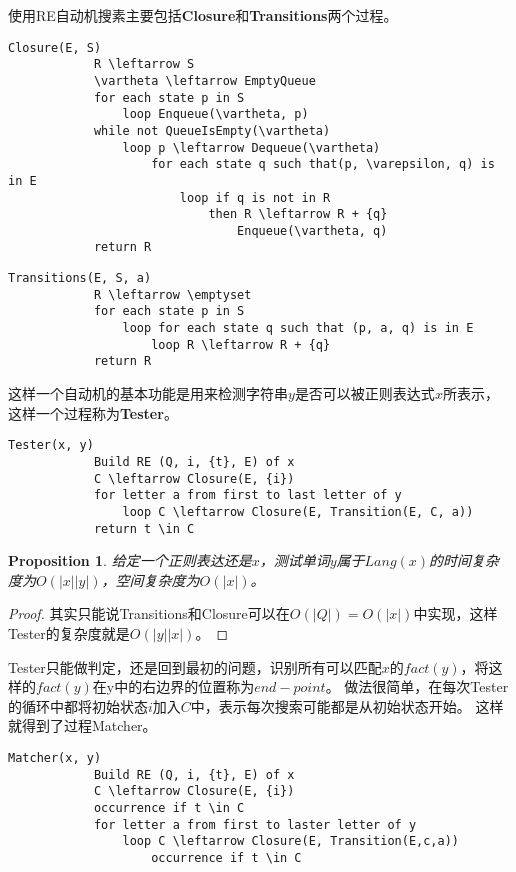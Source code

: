 \documentclass[UTF8]{ctexart}
\newtheorem{prop}[thm]{Proposition}
\theoremstyle{definition}
\theoremstyle{remark}
\numberwithin{equation}{subsection}
\newcommand{\Emph}{\textbf}
\begin{document}
	使用RE自动机搜素主要包括\Emph{Closure}和\Emph{Transitions}两个过程。
	\begin{lstlisting}[frame=shadowbox,framexleftmargin=5mm,rulesepcolor=\color{gray},numbers=none]
		Closure(E, S)
			R \leftarrow S
			\vartheta \leftarrow EmptyQueue
			for each state p in S
				loop Enqueue(\vartheta, p)
			while not QueueIsEmpty(\vartheta)
				loop p \leftarrow Dequeue(\vartheta)
					for each state q such that(p, \varepsilon, q) is in E
						loop if q is not in R
							then R \leftarrow R + {q}
								Enqueue(\vartheta, q)
			return R
	\end{lstlisting}
	\begin{lstlisting}[frame=shadowbox,framexleftmargin=5mm,rulesepcolor=\color{gray},numbers=none]
		Transitions(E, S, a)
			R \leftarrow \emptyset
			for each state p in S
				loop for each state q such that (p, a, q) is in E
					loop R \leftarrow R + {q}
			return R
	\end{lstlisting}
	
	这样一个自动机的基本功能是用来检测字符串$y$是否可以被正则表达式$x$所表示，这样一个过程称为\Emph{Tester}。
	\begin{lstlisting}[frame=shadowbox,framexleftmargin=5mm,rulesepcolor=\color{gray},numbers=none]
		Tester(x, y)
			Build RE (Q, i, {t}, E) of x
			C \leftarrow Closure(E, {i})
			for letter a from first to last letter of y
				loop C \leftarrow Closure(E, Transition(E, C, a))
			return t \in C
	\end{lstlisting}
	
	\begin{prop}
		给定一个正则表达还是$x$，测试单词$y$属于$Lang(x)$的时间复杂度为$O(|x||y|)$，空间复杂度为$O(|x|)$。
	\end{prop}
	
	\begin{proof}
		其实只能说Transitions和Closure可以在$O(|Q|)=O(|x|)$中实现，这样Tester的复杂度就是$O(|y||x|)$。
	\end{proof}
	
	Tester只能做判定，还是回到最初的问题，识别所有可以匹配$x$的$fact(y)$，将这样的$fact(y)$在y中的右边界的位置称为$end-point$。
	做法很简单，在每次Tester的循环中都将初始状态$i$加入$C$中，表示每次搜索可能都是从初始状态开始。
	这样就得到了过程Matcher。
	
	\begin{lstlisting}[frame=shadowbox,framexleftmargin=5mm,rulesepcolor=\color{gray},numbers=none]
		Matcher(x, y)
			Build RE (Q, i, {t}, E) of x
			C \leftarrow Closure(E, {i})
			occurrence if t \in C
			for letter a from first to laster letter of y
				loop C \leftarrow Closure(E, Transition(E,c,a))
					occurrence if t \in C
	\end{lstlisting}
	
\end{document}
